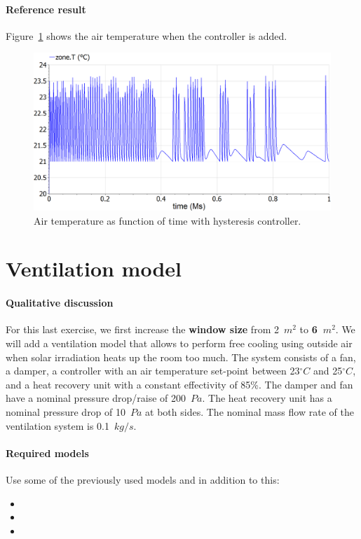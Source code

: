 \documentclass[10pt,a4paper]{article}
\begin{document}
\paragraph{Reference result}
Figure~\ref{fig:res5} shows the air temperature when the controller is added.
\begin{figure}[h]
\centering
\includegraphics[width=0.6\columnwidth]{result5.png}
\caption{Air temperature as function of time with hysteresis controller.}
\label{fig:res5}
\end{figure}


\section{Ventilation model} \label{sec:ventilation}
\paragraph{Qualitative discussion}
For this last exercise, we first increase the \textbf{window size} from 2~$m^2$ to \textbf{6~$m^2$}. We will add a ventilation model that allows to perform free cooling using outside air when solar irradiation heats up the room too much. The system consists of a fan, a damper, a controller with an air temperature set-point between 23$^{\circ}C$ and 25$^{\circ}C$, and a heat recovery unit with a constant effectivity of 85\%. The damper and fan have a nominal pressure drop/raise of 200~$Pa$. The heat recovery unit has a nominal pressure drop of 10~$Pa$ at both sides. The nominal mass flow rate of the ventilation system is 0.1~$kg/s$.


\paragraph{Required models}
Use some of the previously used models and in addition to this:
\begin{itemize}
\item {}
\item {}
\item {}
\end{itemize}
\end{document}
